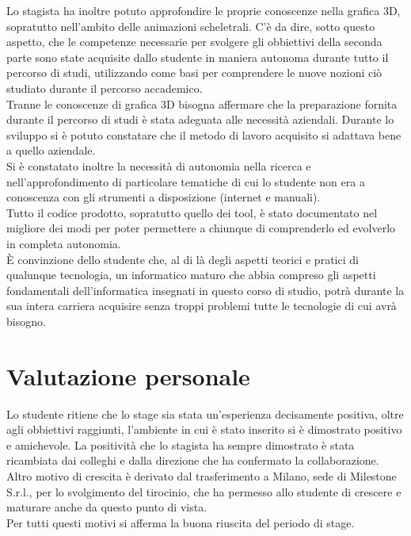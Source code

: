 Lo stagista ha inoltre potuto approfondire le proprie conoscenze nella grafica 3D, sopratutto nell'ambito delle animazioni scheletrali. C'è da dire, sotto questo aspetto, che le competenze necessarie per svolgere gli obbiettivi della seconda parte sono state acquisite dallo studente in maniera autonoma durante tutto il percorso di studi, utilizzando come basi per comprendere le nuove nozioni ciò studiato durante il percorso accademico.\\

Tranne le conoscenze di grafica 3D bisogna affermare che la preparazione fornita durante il percorso di studi è stata adeguata alle necessità aziendali. Durante lo sviluppo si è potuto constatare che il metodo di lavoro acquisito si adattava bene a quello aziendale.\\

Si è constatato inoltre la necessità di autonomia nella ricerca e nell'approfondimento di particolare tematiche di cui lo studente non era a conoscenza con gli strumenti a disposizione (internet e manuali).\\

Tutto il codice prodotto, sopratutto quello dei tool, è stato documentato nel migliore dei modi per poter permettere a chiunque di comprenderlo ed evolverlo in completa autonomia.\\

È convinzione dello studente che, al di là degli aspetti teorici e pratici di qualunque tecnologia, un informatico maturo che abbia compreso gli aspetti fondamentali dell'informatica insegnati in questo corso di studio, potrà durante la sua intera carriera acquisire senza troppi problemi tutte le tecnologie di cui avrà bisogno.

\section{Valutazione personale}

Lo studente ritiene che lo stage sia stata un'esperienza decisamente positiva, oltre agli obbiettivi raggiunti, l'ambiente in cui è stato inserito si è dimostrato positivo e amichevole. La positività che lo stagista ha sempre dimostrato è stata ricambiata dai colleghi e dalla direzione che ha confermato la collaborazione. Altro motivo di crescita è derivato dal trasferimento a Milano, sede di Milestone S.r.l., per lo svolgimento del tirocinio, che ha permesso allo studente di crescere e maturare anche da questo punto di vista.\\

Per tutti questi motivi si afferma la buona riuscita del periodo di stage.
